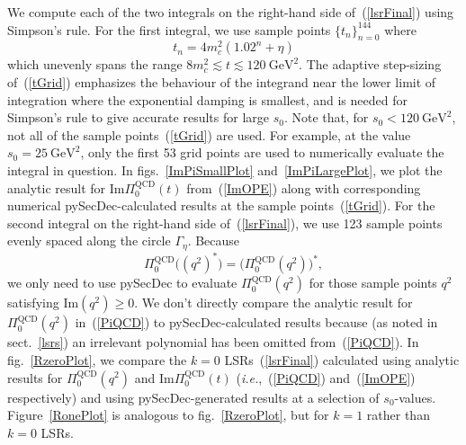 \documentclass[12pt, letterpaper]{article}
\renewcommand{\Im}{\mathrm{Im}}
\newcommand{\gev}{\ensuremath{\text{GeV}}}
\newcommand{\ie}{\textit{i.e.}}
\begin{document}
We compute each of the two integrals on the right-hand side of~(\ref{lsrFinal}) using Simpson's rule.
For the first integral, we use sample points $\{t_n\}_{n=0}^{144}$ where 
\begin{equation}\label{tGrid}
  t_n = 4m_c^2(1.02^n+\eta)
\end{equation}
which unevenly spans the range $8m_c^2\lesssim t\lesssim120\ \gev^2$. 
The adaptive step-sizing of~(\ref{tGrid}) emphasizes the behaviour of the integrand
near the lower limit of integration where the exponential damping is smallest,
and is needed for Simpson's rule to give accurate results for large $s_0$.
Note that, for $s_0<120\ \gev^2$, not all of the sample points~(\ref{tGrid}) are used.
For example, at the value $s_0=25\ \gev^2$, 
only the first 53 grid points 
are used to numerically evaluate the integral in question.
In figs.~\ref{ImPiSmallPlot} and~\ref{ImPiLargePlot}, 
we plot the analytic result for $\Im\Pi_0^{\text{QCD}}(t)$ from~(\ref{ImOPE}) 
along with corresponding numerical pySecDec-calculated results at 
the sample points~(\ref{tGrid}).
For the second integral on the right-hand side of~(\ref{lsrFinal}), we use 
123 sample points evenly spaced along the circle $\Gamma_{\eta}$.
Because
\begin{equation}
  \Pi_0^{\text{QCD}}\big((q^{2})^{*}\big) = \Big(\Pi_0^{\text{QCD}}(q^2)\Big)^{*},
\end{equation}
we only need to use pySecDec to evaluate $\Pi_0^{\text{QCD}}(q^2)$ for 
those sample points $q^2$ satisfying $\Im(q^2)\geq0$.
We don't directly compare the analytic result for $\Pi_0^{\text{QCD}}(q^2)$ in~(\ref{PiQCD}) 
to pySecDec-calculated results because (as noted in sect.~\ref{lsrs})
an irrelevant polynomial has been omitted from~(\ref{PiQCD}).
In fig.~\ref{RzeroPlot}, we compare the $k=0$ LSRs~(\ref{lsrFinal})
calculated using analytic results for $\Pi_0^{\text{QCD}}(q^2)$ and $\Im\Pi_0^{\text{QCD}}(t)$ 
(\ie,~(\ref{PiQCD}) and~(\ref{ImOPE}) respectively) 
and using pySecDec-generated results at a selection of $s_0$-values.
Figure~\ref{RonePlot} is analogous to fig.~\ref{RzeroPlot}, but for $k=1$ rather 
than $k=0$ LSRs.
\end{document}
